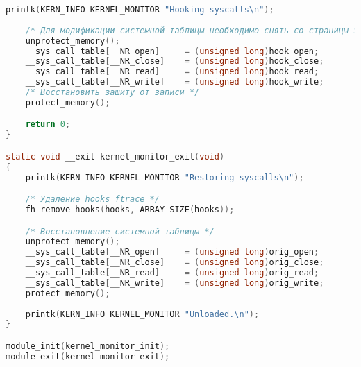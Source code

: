 \begin{lstlisting}[language=C, label=lst:kernel_monitor_c, caption=kernel\_monitor.c.]
    printk(KERN_INFO KERNEL_MONITOR "Hooking syscalls\n");
    
    /* Для модификации системной таблицы необходимо снять со страницы защиту от записи */
    unprotect_memory();
    __sys_call_table[__NR_open]     = (unsigned long)hook_open;
    __sys_call_table[__NR_close]    = (unsigned long)hook_close;
    __sys_call_table[__NR_read]     = (unsigned long)hook_read;
    __sys_call_table[__NR_write]    = (unsigned long)hook_write;
    /* Восстановить защиту от записи */
    protect_memory();

    return 0;
}

static void __exit kernel_monitor_exit(void)
{
    printk(KERN_INFO KERNEL_MONITOR "Restoring syscalls\n");

    /* Удаление hooks ftrace */
    fh_remove_hooks(hooks, ARRAY_SIZE(hooks));

    /* Восстановление системной таблицы */
    unprotect_memory();
    __sys_call_table[__NR_open]     = (unsigned long)orig_open;
    __sys_call_table[__NR_close]    = (unsigned long)orig_close;
    __sys_call_table[__NR_read]     = (unsigned long)orig_read;
    __sys_call_table[__NR_write]    = (unsigned long)orig_write;
    protect_memory();
    
    printk(KERN_INFO KERNEL_MONITOR "Unloaded.\n");
}

module_init(kernel_monitor_init);
module_exit(kernel_monitor_exit); 
\end{lstlisting}

\pagebreak